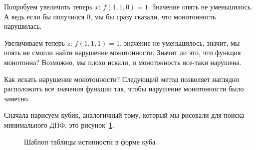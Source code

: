 \documentclass{article}
\begin{document}
    Попробуем увеличить теперь $x$: $f(1, 1, 0)=1$. Значение опять не уменьшилось. А ведь если бы получился 0,
    мы бы сразу сказали, что монотонность нарушилась.

    Увеличиваем теперь $z$: $f(1, 1, 1)=1$, значение не уменьшилось, значит, мы опять не смогли найти нарушение монотонности. Значит ли это, что функция монотонна? Возможно, мы плохо искали, и монотонность все-таки нарушена.

    Как искать нарушение монотонности? Следующий метод позволяет наглядно расположить все значения функции так, чтобы нарушение монотонности было заметно.

    Сначала нарисуем кубик, аналогичный тому, который мы рисовали для поиска минимального ДНФ, это рисунок~\ref{fig:cube-truth-table}.

    \begin{figure}
        \begin{center}
            
        \end{center}
        \caption{Шаблон таблицы истинности в форме куба}
        \label{fig:cube-truth-table}
    \end{figure}
\end{document}

